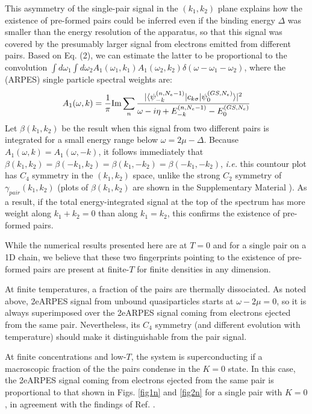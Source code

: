 \documentclass[prl,twocolumn,showpacs,amsmath,amssymb,superscriptaddress,floatfix]{revtex4}
\begin{document}
This asymmetry of the single-pair signal in the $(k_1,k_2)$ plane explains how the existence of pre-formed pairs could be inferred even if the binding energy $\Delta$ was smaller than the energy resolution of the apparatus, so that  this signal was covered by the presumably larger signal from electrons emitted from different pairs. Based on Eq. (2), we can estimate the latter to be proportional to the convolution  $\int d\omega_1 \int d\omega_2  A_1(\omega_1, k_1) A_1(\omega_2, k_2)\delta(\omega - \omega_1-\omega_2)$, where the (ARPES) single particle spectral weights are:
\begin{equation}
    A_1(\omega, k) = {1\over \pi} \mbox{Im} \sum_{n} \frac{|\langle \psi^{(n,N_e-1)}_{ -k}| c_{k\sigma}| \psi^{(GS,N_e)}_0\rangle|^2}{\omega - i \eta +E_{-k}^{(n,N_e-1)}-E_0^{(GS,N_e)}}
\end{equation}
Let $\beta(k_1,k_2)$ be the result when this signal from two different pairs is integrated for a  small energy range below $\omega=2\mu-\Delta$. Because $A_1(\omega,k) = A_1(\omega,-k) $, it follows immediately that $\beta(k_1,k_2)= \beta(- k_1, k_2)=\beta(k_1,-k_2)= \beta(- k_1, -k_2)$, {\em i.e.} this countour plot has $C_4$ symmetry in the $(k_1,k_2)$ space, unlike the strong $C_2$ symmetry of $\gamma_{pair}(k_1,k_2)$ (plots of $\beta(k_1,k_2)$ are shown in the Supplementary Material \cite{SM}). As a result, if the total energy-integrated signal at the top of the spectrum has more weight along  $k_1+k_2=0$  than along $k_1=k_2$, this confirms the existence of pre-formed pairs.

While the numerical results presented here are at $T=0$ and for a single pair on a 1D chain, we believe that these two fingerprints pointing to the existence of pre-formed pairs are present at finite-$T$ for finite densities in any dimension.

At finite temperatures, a fraction of the pairs are thermally dissociated. As noted above, 2eARPES signal from unbound quasiparticles starts at $\omega-2\mu=0$, so it is always superimposed over the 2eARPES signal coming from electrons ejected from the same pair. Nevertheless, its $C_4$ symmetry (and different evolution with temperature) should make it distinguishable from the pair signal.

At finite concentrations and low-$T$, the system is superconducting if a macroscopic fraction of the
the pairs condense in the $K=0$ state. In this case, the 2eARPES signal coming from electrons ejected from the same pair is proportional to that shown in Figs. \ref{fig1n} and \ref{fig2n} for a single pair with $K=0$,  in agreement with the findings of  Ref. \cite{Devereaux_2023}.
\end{document}
